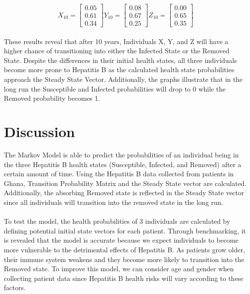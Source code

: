 \documentclass{article}
\begin{document}
\begin{equation*}
X_{10} = 
\begin{bmatrix}
        0.05 \\
        0.61 \\
        0.34
\end{bmatrix}
Y_{10} = 
\begin{bmatrix}
        0.08 \\
        0.67 \\
        0.25
\end{bmatrix}
Z_{10} = 
\begin{bmatrix}
        0.00 \\
        0.65 \\
        0.35
\end{bmatrix}
\end{equation*}
\\
These results reveal that after 10 years, Individuals X, Y, and Z will have a higher chance of transitioning into either the Infected State or the Removed State. Despite the differences in their initial health states, all three individuals become more prone to Hepatitis B as the calculated health state probabilities approach the Steady State Vector. Additionally, the graphs illustrate that in the long run the Susceptible and Infected probabilities will drop to 0 while the Removed probability becomes 1. 


\section{Discussion}

The Markov Model is able to predict the probabilities of an individual being in the three Hepatitis B health states (Susceptible, Infected, and Removed) after a certain amount of time. Using the Hepatitis B data collected from patients in Ghana, Transition Probability Matrix and the Steady State vector are calculated. Additionally, the absorbing Removed state is reflected in the Steady State vector since all individuals will transition into the removed state in the long run. 
\\ \\
To test the model, the health probabilities of 3 individuals are calculated by defining potential initial state vectors for each patient. Through benchmarking, it is revealed that the model is accurate because we expect individuals to become more vulnerable to the detrimental effects of Hepatitis B. As patients grow older, their immune system weakens and they become more likely to transition into the Removed state. To improve this model, we can consider age and gender when collecting patient data since Hepatitis B health risks will vary according to these factors. 
\end{document}
